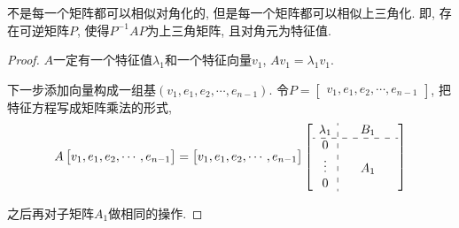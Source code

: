 不是每一个矩阵都可以相似对角化的, 但是每一个矩阵都可以相似上三角化. 即, 存在可逆矩阵$P$, 使得$P ^{-1} A P$为上三角矩阵, 且对角元为特征值.
\begin{proof}
    $A$一定有一个特征值$\lambda_1$和一个特征向量$v_1$, $A v_1 = \lambda_1 v_1$. 
    
    下一步添加向量构成一组基$\left( v_1,e_1,e_2,\cdots,e_{n-1} \right) $.
    令$P = \begin{bmatrix} v_1, e_1, e_2, \cdots, e_{n-1} \end{bmatrix}$, 把特征方程写成矩阵乘法的形式,
    \begin{equation}
      A \begin{bmatrix} v_1, e_1, e_2, \cdots, e_{n-1} \end{bmatrix} = \begin{bmatrix} v_1, e_1, e_2, \cdots, e_{n-1} \end{bmatrix} 
      \left[
        \begin{array}{c:ccc}
            \lambda_1 & \  & B_1 & \  \\
            \hdashline
            0 & & & \\
            \vdots & & A_1 & \\
            0 & & & \\
        \end{array} 
       \right] 
    \end{equation}

    之后再对子矩阵$A_1$做相同的操作.
\end{proof}